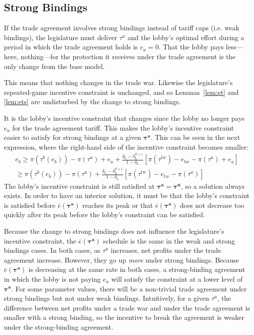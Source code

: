 \documentclass[authoryear, review]{elsarticle}
\newcommand{\ov}{\overline}
\newcommand{\bta}{\bm{\tau^a}}
\newcommand{\btn}{\bm{\tau^n}}
\newcommand{\de}{\delta}
\begin{document}
\subsection{Strong Bindings}
If the trade agreement involves strong bindings instead of tariff caps (i.e. weak bindings), the legislature must deliver $\tau^a$ and the lobby's optimal effort during a period in which the trade agreement holds is $e_a = 0$. That the lobby pays less---here, nothing---for the protection it receives under the trade agreement is the only change from the base model.

This means that nothing changes in the trade war. Likewise the legislature's repeated-game incentive constraint is unchanged, and so Lemmas~\ref{lem:et} and \ref{lem:ets} are undisturbed by the change to strong bindings.

It is the lobby's incentive constraint that changes since the lobby no longer pays $e_a$ for the trade agreement tariff. This makes the lobby's incentive constraint easier to satisfy for strong bindings at a given $\bta$. This can be seen in the next expression, where the right-hand side of the incentive constraint becomes smaller:
\begin{multline*}
	e_b \geq \pi(\tau^b(e_b)) - \pi(\tau^a) + e_a + \frac{\de_\text{L} - \de_\text{L}^{T+1}}{1-\de_\text{L}} \left[\pi(\tau^{tw}) -e_{tw} - \pi(\tau^a) + e_a\right] \\
		\geq \pi(\tau^b(e_b)) - \pi(\tau^a) + \frac{\de_\text{L} - \de_\text{L}^{T+1}}{1-\de_\text{L}} \left[\pi(\tau^{tw}) -e_{tw} - \pi(\tau^a) \right]
\end{multline*}
The lobby's incentive constraint is still satisfied at $\bta = \btn$, so a solution always exists. In order to have an interior solution, it must be that the lobby's constraint is satisfied before $\ov{e}(\bta)$ reaches its peak or that $\ov{e}(\bta)$ does not decrease too quickly after its peak before the lobby's constraint can be satisfied.

Because the change to strong bindings does not influence the legislature's incentive constraint, the $\ov{e}(\bta)$ schedule is the same in the weak and strong bindings cases. In both cases, as $\tau^a$ increases, net profits under the trade agreement increase. However, they go up \textit{more} under strong bindings. Because $\ov{e}(\bta)$ is decreasing at the same rate in both cases, a strong-binding agreement in which the lobby is not paying $e_a$ will satisfy the constraint at a lower level of $\bta$. For some parameter values, there will be a non-trivial trade agreement under strong bindings but not under weak bindings. Intuitively, for a given $\tau^a$, the difference between net profits under a trade war and under the trade agreement is smaller with a strong binding, so the incentive to break the agreement is weaker under the strong-binding agreement.
\end{document}

